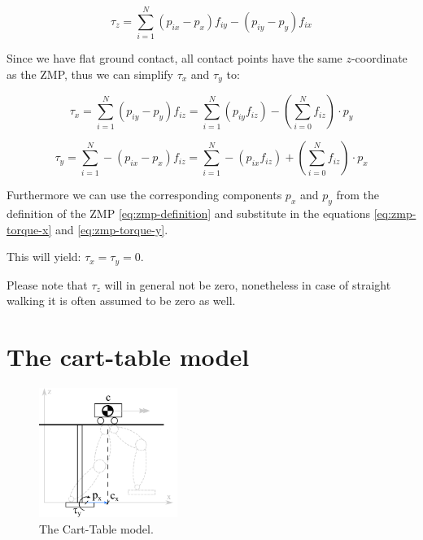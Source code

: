 \documentclass[english,ngerman]{KITreprt}
\begin{document}
\begin{equation}
\tau_z = \sum^N_{i=1} (p_{ix} - p_x) f_{iy} - (p_{iy} - p_y) f_{ix}
\end{equation}

Since we have flat ground contact, all contact points have the same
$z$-coordinate as the ZMP, thus we can simplify $\tau_x$ and $\tau_y$
to:

\begin{equation} \label{eq:zmp-torque-x}
\tau_x = \sum^N_{i=1} (p_{iy} - p_y) f_{iz} = \sum^N_{i=1} (p_{iy} f_{iz}) - (\sum^N_{i=0} f_{iz}) \cdot p_y
\end{equation}

\begin{equation}\label{eq:zmp-torque-y}
\tau_y = \sum^N_{i=1} - (p_{ix} - p_x) f_{iz} = \sum^N_{i=1} - (p_{ix} f_{iz}) + (\sum^N_{i=0} f_{iz}) \cdot p_x
\end{equation}

Furthermore we can use the corresponding components $p_x$ and $p_y$ from
the definition of the ZMP \ref{eq:zmp-definition} and substitute in the
equations \ref{eq:zmp-torque-x} and \ref{eq:zmp-torque-y}.

This will yield: $\tau_x = \tau_y = 0$.

Please note that $\tau_z$ will in general not be zero, nonetheless in
case of straight walking it is often assumed to be zero as well.

\section{The cart-table model}\label{section:cart-table}

\begin{figure}
  \begin{center}
     \includegraphics[width=0.4\textwidth]{images/carttable.png}
  \end{center}
  \caption{The Cart-Table model.}
\end{figure}
\end{document}
